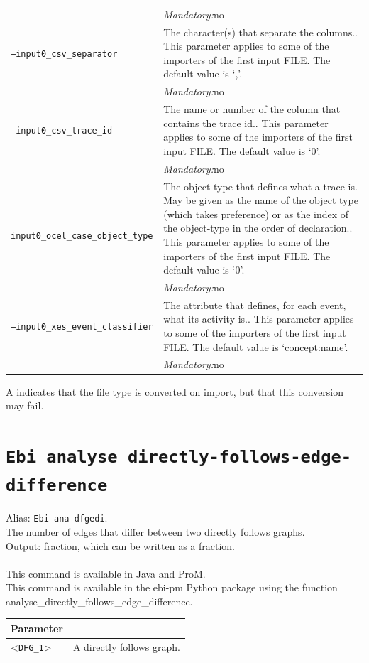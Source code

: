 {\begin{tabularx}{\linewidth}{lX}
&\textit{Mandatory:}\quad no\\
\texttt{--input0\_csv\_separator} & The character(s) that separate the columns.. This parameter applies to some of the importers of the first input FILE. The default value is `,'.\\
&\textit{Mandatory:}\quad no\\
\texttt{--input0\_csv\_trace\_id} & The name or number of the column that contains the trace id.. This parameter applies to some of the importers of the first input FILE. The default value is `0'.\\
&\textit{Mandatory:}\quad no\\
\texttt{--input0\_ocel\_case\_object\_type} & The object type that defines what a trace is. May be given as the name of the object type (which takes preference) or as the index of the object-type in the order of declaration.. This parameter applies to some of the importers of the first input FILE. The default value is `0'.\\
&\textit{Mandatory:}\quad no\\
\texttt{--input0\_xes\_event\_classifier} & The attribute that defines, for each event, what its activity is.. This parameter applies to some of the importers of the first input FILE. The default value is `concept:name'.\\
&\textit{Mandatory:}\quad no\\
\bottomrule
\end{tabularx}
A \textdagger{} indicates that the file type is converted on import, but that this conversion may fail.
\clearpage\section{\texttt{Ebi analyse directly-follows-edge-difference}}
\label{command:Ebi analyse directly-follows-edge-difference}
Alias: \texttt{Ebi ana dfgedi}.\\
The number of edges that differ between two directly follows graphs.\\
\noindent Output: fraction, which can be written as a fraction.\\
\\This command is available in Java and ProM.
\\This command is available in the ebi-pm Python package using the function analyse\_directly\_follows\_edge\_difference.
\begin{tabularx}{\linewidth}{lX}
\toprule
Parameter \\\midrule
<\texttt{DFG\_1}>&A directly follows graph.\\

\end{tabularx}}
